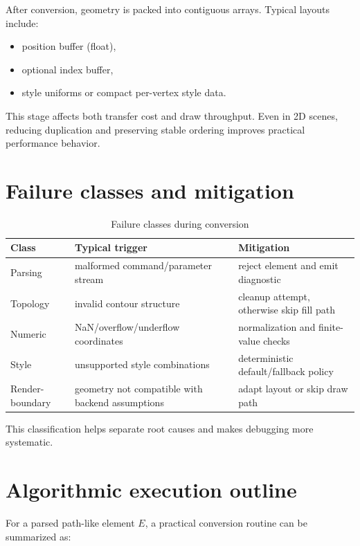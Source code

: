 After conversion, geometry is packed into contiguous arrays.
Typical layouts include:

\begin{itemize}
\item position buffer (float),
\item optional index buffer,
\item style uniforms or compact per-vertex style data.
\end{itemize}

This stage affects both transfer cost and draw throughput.
Even in 2D scenes, reducing duplication and preserving stable ordering improves practical performance behavior.

\section{Failure classes and mitigation}

\begin{table}[htbp]
\centering
\caption{Failure classes during conversion}
\label{tab:conversion_failure_classes}
\begin{tabular}{>{\raggedright\arraybackslash}p{2.6cm} >{\raggedright\arraybackslash}p{4.3cm} >{\raggedright\arraybackslash}p{4.9cm}}
\toprule
\textbf{Class} & \textbf{Typical trigger} & \textbf{Mitigation} \\
\midrule
Parsing & malformed command/parameter stream & reject element and emit diagnostic \\
Topology & invalid contour structure & cleanup attempt, otherwise skip fill path \\
Numeric & NaN/overflow/underflow coordinates & normalization and finite-value checks \\
Style & unsupported style combinations & deterministic default/fallback policy \\
Render-boundary & geometry not compatible with backend assumptions & adapt layout or skip draw path \\
\bottomrule
\end{tabular}
\end{table}

This classification helps separate root causes and makes debugging more systematic.

\section{Algorithmic execution outline}

For a parsed path-like element $E$, a practical conversion routine can be summarized as:

